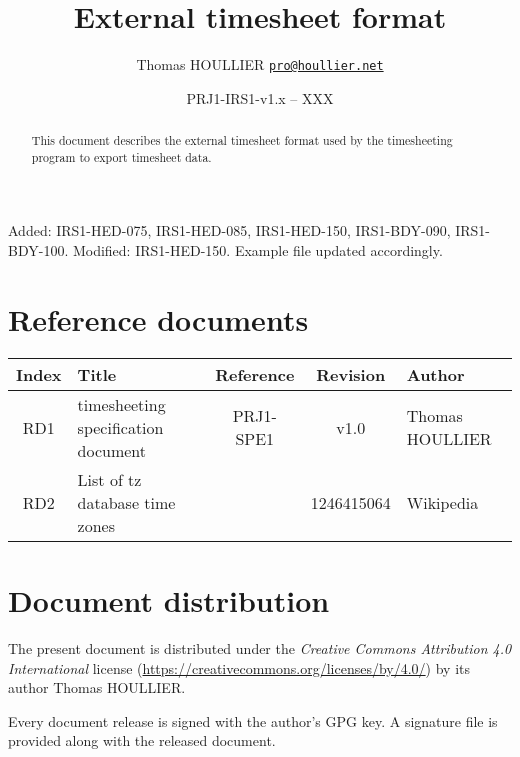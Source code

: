 \documentclass[letterpaper]{article}
\title{External timesheet format}
\author{Thomas HOULLIER \href{mailto:pro@houllier.net}
         {\texttt{\textlangle pro@houllier.net\textrangle}}}
\begin{document}
\frenchspacing
\date{PRJ1-IRS1-v1.x -- XXX}
\maketitle
\thispagestyle{FirstPage}

\begin{abstract}
  This document describes the external timesheet format used by the
  timesheeting program to export timesheet data.
\end{abstract}

\begin{versionhistory}
  {Added: IRS1-HED-075, IRS1-HED-085, IRS1-HED-150, IRS1-BDY-090, IRS1-BDY-100.
   Modified: IRS1-HED-150.
   Example file updated accordingly.}
\end{versionhistory}
\setcounter{table}{0} %

\section*{Reference documents}
{ \centering
  \begin{tabularx}{\textwidth}{| c | X | c | c | X |} \hline
    Index & Title & Reference & Revision & Author \\ \hline
    RD1 & timesheeting specification document & PRJ1-SPE1 & v1.0 & Thomas
    HOULLIER \\ \hline
    RD2 & List of tz database time zones &
    \cite{wiki:tz_list} & 1246415064 & Wikipedia \\ \hline
  \end{tabularx} \par }

\section*{Document distribution}
The present document is distributed under the \emph{Creative Commons Attribution
  4.0 International} license (\url{https://creativecommons.org/licenses/by/4.0/})
by its author Thomas HOULLIER.

Every document release is signed with the author's GPG key. A signature file
is provided along with the released document.

\tableofcontents
\printglossary[type=\acronymtype,style=index]
\pagestyle{plain}





\appendix


\apptocmd{\thebibliography}{\raggedright}{}{}
\begingroup
{}
\setlength\bibitemsep{0pt}
\printbibliography
\endgroup
\end{document}
